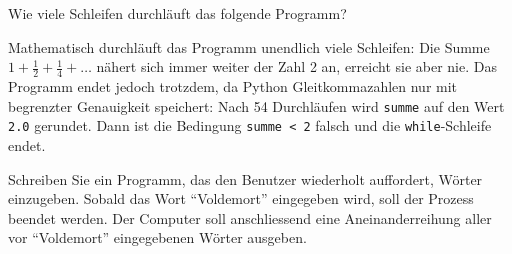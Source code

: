 \begin{mychallenge}
	Wie viele Schleifen durchläuft das folgende Programm?
	
	\begin{myanswer}
		Mathematisch durchläuft das Programm unendlich viele Schleifen: Die Summe $1 + \frac{1}{2} + \frac{1}{4} + \ldots$ nähert sich immer weiter der Zahl 2 an, erreicht sie aber nie. Das Programm endet jedoch trotzdem, da Python Gleitkommazahlen nur mit begrenzter Genauigkeit speichert: Nach 54 Durchläufen wird \lstinline|summe| auf den Wert \lstinline|2.0| gerundet. Dann ist die Bedingung \lstinline|summe < 2| falsch und die \lstinline|while|-Schleife endet.
	\end{myanswer}
\end{mychallenge}

\begin{myexercise}
	Schreiben Sie ein Programm, das den Benutzer wiederholt auffordert, Wörter einzugeben. Sobald das Wort \enquote{Voldemort} eingegeben wird, soll der Prozess beendet werden. Der Computer soll anschliessend eine Aneinanderreihung aller vor \enquote{Voldemort} eingegebenen Wörter ausgeben.
	\begin{myanswer}
		
	\end{myanswer}
\end{myexercise}

